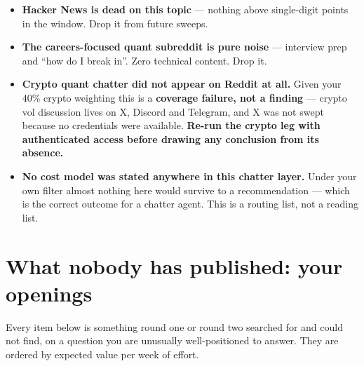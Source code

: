 \documentclass[11pt,a4paper]{article}
\begin{document}
\begin{itemize}
\item \textbf{Hacker News is dead on this topic} --- nothing above single-digit
points in the window. Drop it from future sweeps.
\item \textbf{The careers-focused quant subreddit is pure noise} --- interview prep
and ``how do I break in''. Zero technical content. Drop it.
\item \textbf{Crypto quant chatter did not appear on Reddit at all.} Given your
40\% crypto weighting this is a \textbf{coverage failure, not a finding} --- crypto
vol discussion lives on X, Discord and Telegram, and X was not swept because no
credentials were available. \textbf{Re-run the crypto leg with authenticated access
before drawing any conclusion from its absence.}
\item \textbf{No cost model was stated anywhere in this chatter layer.} Under your
own filter almost nothing here would survive to a recommendation --- which is the
correct outcome for a chatter agent. This is a routing list, not a reading list.
\end{itemize}

\newpage
\section{What nobody has published: your openings}
\label{sec:openings}

Every item below is something round one or round two searched for and could not
find, on a question you are unusually well-positioned to answer. They are ordered
by expected value per week of effort.
\end{document}
